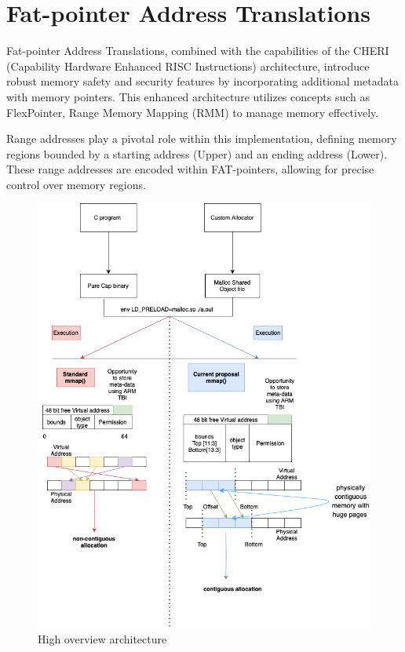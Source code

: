 \documentclass[11pt]{article}
\author{Akilan}
\date{\today}
\title{}
\begin{document}
\tableofcontents


\section{Fat-pointer Address Translations}
\label{sec:orgda6e9a4}

Fat-pointer Address Translations, combined with the capabilities of the CHERI (Capability Hardware Enhanced RISC Instructions) 
architecture, introduce robust memory safety and security features by incorporating additional metadata 
with memory pointers. This enhanced architecture utilizes concepts such as FlexPointer, 
Range Memory Mapping (RMM) to manage memory effectively.

Range addresses play a pivotal role within this implementation, defining memory 
regions bounded by a starting address (Upper) and an ending address (Lower). 
These range addresses are encoded within FAT-pointers, allowing for precise 
control over memory regions.

\begin{figure}[htbp]
\centering
\includegraphics[width=.9\linewidth]{diagram/HighOverviewArchitecture24.png}
\caption{\label{fig:orgcc16dce}High overview architecture}
\end{figure}
\end{document}
